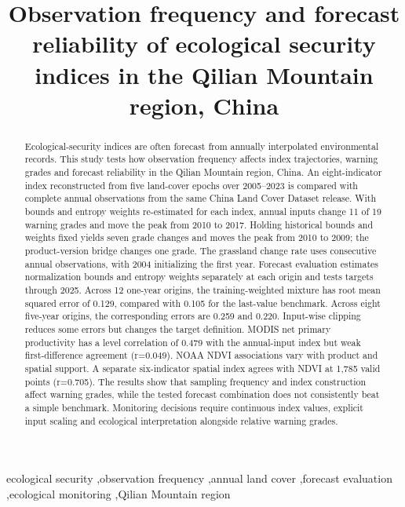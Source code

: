 \documentclass[preprint,11pt,authoryear]{elsarticle}
\begin{document}
\begin{frontmatter}

\title{Observation frequency and forecast reliability of ecological security indices in the Qilian Mountain region, China}


\begin{abstract}
Ecological-security indices are often forecast from annually interpolated environmental records. This study tests how observation frequency affects index trajectories, warning grades and forecast reliability in the Qilian Mountain region, China. An eight-indicator index reconstructed from five land-cover epochs over 2005--2023 is compared with complete annual observations from the same China Land Cover Dataset release. With bounds and entropy weights re-estimated for each index, annual inputs change 11 of 19 warning grades and move the peak from 2010 to 2017. Holding historical bounds and weights fixed yields seven grade changes and moves the peak from 2010 to 2009; the product-version bridge changes one grade. The grassland change rate uses consecutive annual observations, with 2004 initializing the first year. Forecast evaluation estimates normalization bounds and entropy weights separately at each origin and tests targets through 2025. Across 12 one-year origins, the training-weighted mixture has root mean squared error of 0.129, compared with 0.105 for the last-value benchmark. Across eight five-year origins, the corresponding errors are 0.259 and 0.220. Input-wise clipping reduces some errors but changes the target definition. MODIS net primary productivity has a level correlation of 0.479 with the annual-input index but weak first-difference agreement (r=0.049). NOAA NDVI associations vary with product and spatial support. A separate six-indicator spatial index agrees with NDVI at 1,785 valid points (r=0.705). The results show that sampling frequency and index construction affect warning grades, while the tested forecast combination does not consistently beat a simple benchmark. Monitoring decisions require continuous index values, explicit input scaling and ecological interpretation alongside relative warning grades.

\end{abstract}

\begin{keyword}
ecological security \sep observation frequency \sep annual land cover \sep forecast evaluation \sep ecological monitoring \sep Qilian Mountain region
\end{keyword}

\end{frontmatter}
\end{document}
